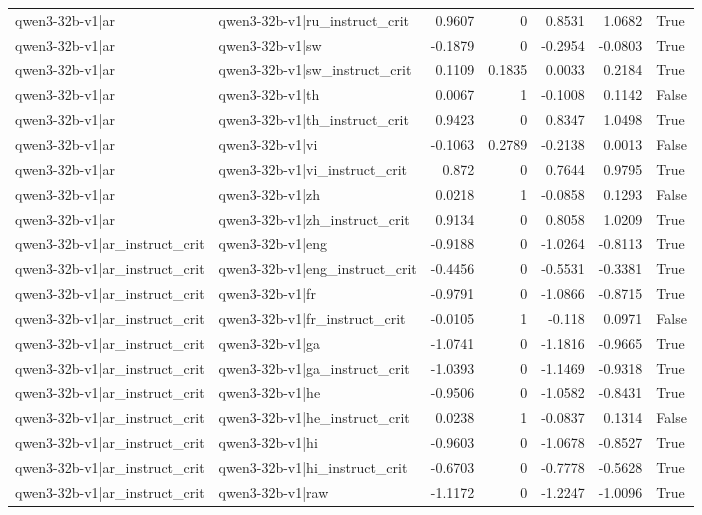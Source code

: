 \begin{table}
\begin{tabular}{l l r r r r l}
qwen3-32b-v1|ar & qwen3-32b-v1|ru_instruct_crit & 0.9607 & 0 & 0.8531 & 1.0682 & True \\
qwen3-32b-v1|ar & qwen3-32b-v1|sw & -0.1879 & 0 & -0.2954 & -0.0803 & True \\
qwen3-32b-v1|ar & qwen3-32b-v1|sw_instruct_crit & 0.1109 & 0.1835 & 0.0033 & 0.2184 & True \\
qwen3-32b-v1|ar & qwen3-32b-v1|th & 0.0067 & 1 & -0.1008 & 0.1142 & False \\
qwen3-32b-v1|ar & qwen3-32b-v1|th_instruct_crit & 0.9423 & 0 & 0.8347 & 1.0498 & True \\
qwen3-32b-v1|ar & qwen3-32b-v1|vi & -0.1063 & 0.2789 & -0.2138 & 0.0013 & False \\
qwen3-32b-v1|ar & qwen3-32b-v1|vi_instruct_crit & 0.872 & 0 & 0.7644 & 0.9795 & True \\
qwen3-32b-v1|ar & qwen3-32b-v1|zh & 0.0218 & 1 & -0.0858 & 0.1293 & False \\
qwen3-32b-v1|ar & qwen3-32b-v1|zh_instruct_crit & 0.9134 & 0 & 0.8058 & 1.0209 & True \\
qwen3-32b-v1|ar_instruct_crit & qwen3-32b-v1|eng & -0.9188 & 0 & -1.0264 & -0.8113 & True \\
qwen3-32b-v1|ar_instruct_crit & qwen3-32b-v1|eng_instruct_crit & -0.4456 & 0 & -0.5531 & -0.3381 & True \\
qwen3-32b-v1|ar_instruct_crit & qwen3-32b-v1|fr & -0.9791 & 0 & -1.0866 & -0.8715 & True \\
qwen3-32b-v1|ar_instruct_crit & qwen3-32b-v1|fr_instruct_crit & -0.0105 & 1 & -0.118 & 0.0971 & False \\
qwen3-32b-v1|ar_instruct_crit & qwen3-32b-v1|ga & -1.0741 & 0 & -1.1816 & -0.9665 & True \\
qwen3-32b-v1|ar_instruct_crit & qwen3-32b-v1|ga_instruct_crit & -1.0393 & 0 & -1.1469 & -0.9318 & True \\
qwen3-32b-v1|ar_instruct_crit & qwen3-32b-v1|he & -0.9506 & 0 & -1.0582 & -0.8431 & True \\
qwen3-32b-v1|ar_instruct_crit & qwen3-32b-v1|he_instruct_crit & 0.0238 & 1 & -0.0837 & 0.1314 & False \\
qwen3-32b-v1|ar_instruct_crit & qwen3-32b-v1|hi & -0.9603 & 0 & -1.0678 & -0.8527 & True \\
qwen3-32b-v1|ar_instruct_crit & qwen3-32b-v1|hi_instruct_crit & -0.6703 & 0 & -0.7778 & -0.5628 & True \\
qwen3-32b-v1|ar_instruct_crit & qwen3-32b-v1|raw & -1.1172 & 0 & -1.2247 & -1.0096 & True \\

\end{tabular}
\end{table}
